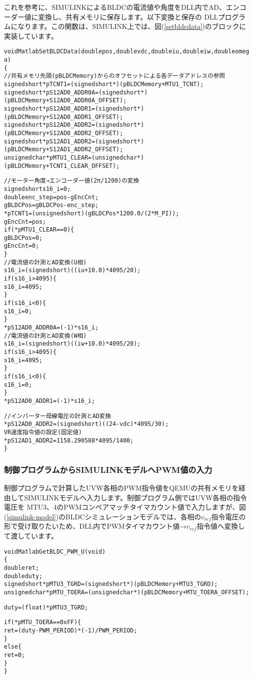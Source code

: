 \documentclass[uplatex,a4paper,twoside,10pt]{jsarticle}
\begin{document}
これを参考に、SIMULINKによるBLDCの電流値や角度をDLL内でAD、エンコーダー値に変換し、共有メモリに保存します。以下変換と保存の
DLLプログラムになります。この関数は、SIMULINK上では、図(\ref{setbldcdata})のブロックに実装しています。
\newpage
{\small
\begin{alltt}
void MatlabSetBLDCData(double pos, double vdc, double iu, double iw, double omega)
\{
    //共有メモリ先頭(pBLDCMemory)からのオフセットによる各データアドレスの参照
    signed short* pTCNT1 = (signed short*)(pBLDCMemory + MTU1_TCNT);
    signed short* pS12AD0_ADDR0A = (signed short*)(pBLDCMemory + S12AD0_ADDR0A_OFFSET);
    signed short* pS12AD0_ADDR1 = (signed short*)(pBLDCMemory + S12AD0_ADDR1_OFFSET);
    signed short* pS12AD0_ADDR2 = (signed short*)(pBLDCMemory + S12AD0_ADDR2_OFFSET);
    signed short* pS12AD1_ADDR2 = (signed short*)(pBLDCMemory + S12AD1_ADDR2_OFFSET);
    unsigned char* pMTU1_CLEAR = (unsigned char*)(pBLDCMemory + TCNT1_CLEAR_OFFSET);

    //モーター角度→エンコーダー値(2π/1200)の変換
    signed short s16_i = 0;
    double enc_step = pos - gEncCnt;
    gBLDCPos = gBLDCPos - enc_step;
    *pTCNT1 = (unsigned short)(gBLDCPos * 1200.0 / (2 * M_PI));
    gEncCnt = pos;
    if (*pMTU1_CLEAR == 0) \{
        gBLDCPos = 0;
        gEncCnt = 0;
    \}
    //電流値の計測とAD変換(U相)
    s16_i = (signed short)((iu + 10.0) * 4095 / 20);
    if (s16_i>4095) \{
        s16_i = 4095;
    \}
    if (s16_i<0) \{
        s16_i = 0;
    \}
    *pS12AD0_ADDR0A = (-1) * s16_i;
    //電流値の計測とAD変換(W相)
    s16_i = (signed short)((iw + 10.0) * 4095 / 20);
    if (s16_i > 4095) \{
        s16_i = 4095;
    \}
    if (s16_i < 0) \{
        s16_i = 0;
    \}
    *pS12AD0_ADDR1 = (-1) * s16_i;

    //インバーター母線電圧の計測とAD変換
    *pS12AD0_ADDR2 = (signed short)( (24 - vdc) * 4095 / 30);
    VR速度指令値の設定(固定値)
    *pS12AD1_ADDR2 = 1158.290588*4095/1400;
\}
\end{alltt}}

\newpage
\subsubsection{制御プログラムからSIMULINKモデルへPWM値の入力}
制御プログラムで計算したUVW各相のPWM指令値をQEMUの共有メモリを経由してSIMULINKモデルへ入力します。制御プログラム側ではUVW各相の指令電圧を
MTU3、4のPWMコンペアマッチタイマカウント値で入力しますが、図(\ref{simulink-model})のBLDCシミュレーションモデルでは、各相の$v_{ref}$指令電圧の
形で受け取りたいため、DLL内でPWMタイマカウント値→$v_{ref}$指令値へ変換して渡しています。
{\small
\begin{alltt}
void MatlabGetBLDC_PWM_U(void)
\{
    double ret;
    double duty;
    signed short* pMTU3_TGRD = (signed short*)(pBLDCMemory + MTU3_TGRD);
    unsigned char *pMTU_TOERA = (unsigned char*)(pBLDCMemory + MTU_TOERA_OFFSET);

    duty = (float)*pMTU3_TGRD;

    if (*pMTU_TOERA == 0xFF) \{
        ret = (duty - PWM_PERIOD) * (-1) / PWM_PERIOD;
    \}
    else \{
        ret = 0;
    \}
\}
\end{alltt}}
\end{document}
